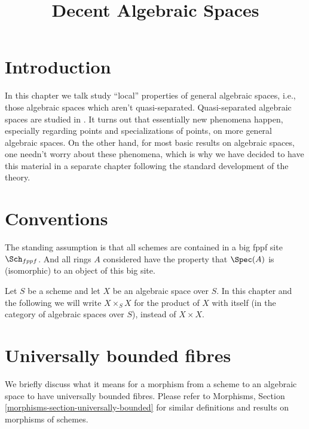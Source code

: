 

%


\title{Decent Algebraic Spaces}


\maketitle

\label{section-phantom}

\tableofcontents

\section{Introduction}
\label{section-introduction}

\noindent
In this chapter we talk study ``local'' properties of general
algebraic spaces, i.e., those algebraic spaces which aren't quasi-separated.
Quasi-separated algebraic spaces are studied in \cite{K}.
It turns out that essentially new phenomena happen, especially
regarding points and specializations of points, on more
general algebraic spaces. On the other hand, for most basic results
on algebraic spaces, one needn't worry about these phenomena, which is why
we have decided to have this material in a separate chapter following
the standard development of the theory.



\section{Conventions}
\label{section-conventions}

\noindent
The standing assumption is that all schemes are contained in
a big fppf site $\Sch_{fppf}$. And all rings $A$ considered
have the property that $\Spec(A)$ is (isomorphic) to an
object of this big site.

\medskip\noindent
Let $S$ be a scheme and let $X$ be an algebraic space over $S$.
In this chapter and the following we will write $X \times_S X$
for the product of $X$ with itself (in the category of algebraic
spaces over $S$), instead of $X \times X$.



\section{Universally bounded fibres}
\label{section-universally-bounded}

\noindent
We briefly discuss what it means for a morphism from a scheme to an
algebraic space to have universally bounded fibres. Please refer to
Morphisms, Section \ref{morphisms-section-universally-bounded}
for similar definitions and results on morphisms of schemes.

